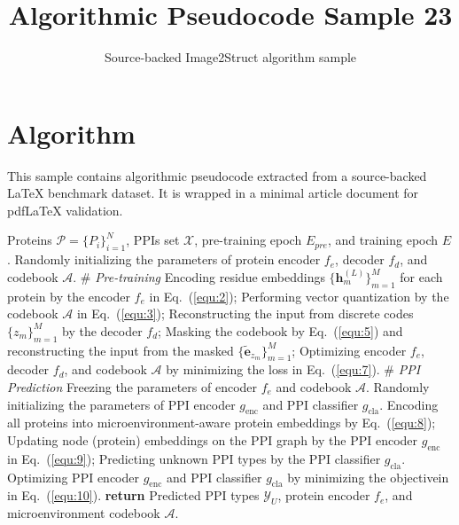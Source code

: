 \documentclass[11pt]{article}
\title{Algorithmic Pseudocode Sample 23}
\author{Source-backed Image2Struct algorithm sample}
\date{}
\begin{document}
\maketitle
\section{Algorithm}
This sample contains algorithmic pseudocode extracted from a source-backed LaTeX benchmark dataset. It is wrapped in a minimal article document for pdfLaTeX validation.

\begin{algorithm}[htbp]
\caption{Source-backed algorithmic procedure}
\begin{algorithmic}[1]
\Require Proteins $\mathcal{P}=\{P_i\}_{i=1}^N$, PPIs set $\mathcal{X}$, pre-training epoch $E_{pre}$, and training epoch $E$.
\State Randomly initializing the parameters of protein encoder $f_e$, decoder $f_d$, and codebook $\mathcal{A}$.
\State \# \textit{Pre-training}
\State Encoding residue embeddings $\{\mathbf{h}^{(L)}_m\}_{m=1}^M$ for each protein by the encoder $f_e$ in Eq.~(\ref{equ:2});
\State Performing vector quantization by the codebook $\mathcal{A}$ in Eq.~(\ref{equ:3});
\State Reconstructing the input from discrete codes $\{z_m\}_{m=1}^M$ by the decoder $f_d$;
\State Masking the codebook by Eq.~(\ref{equ:5}) and reconstructing the input from the masked $\{\widetilde{\mathbf{e}}_{z_m}\}_{m=1}^M$;
\State Optimizing encoder $f_e$, decoder $f_d$, and codebook $\mathcal{A}$ by minimizing the loss in Eq.~(\ref{equ:7}).
\EndFor
\State \# \textit{PPI Prediction}
\State Freezing the parameters of encoder $f_e$ and codebook $\mathcal{A}$.
\State Randomly initializing the parameters of PPI encoder $g_{\text{enc}}$ and PPI classifier $g_{\text{cla}}$.
\State Encoding all proteins into microenvironment-aware protein embeddings by Eq.~(\ref{equ:8});
\State Updating node (protein) embeddings on the PPI graph by the PPI encoder $g_{\text{enc}}$ in Eq.~(\ref{equ:9});
\State Predicting unknown PPI types by the PPI classifier $g_{\text{cla}}$.
\State Optimizing PPI encoder $g_{\text{enc}}$ and PPI classifier $g_{\text{cla}}$ by minimizing the objectivein in Eq.~(\ref{equ:10}).
\EndFor
\State \textbf{return} Predicted PPI types $\mathcal{Y}_U$, protein encoder $f_e$, and microenvironment codebook $\mathcal{A}$.
\end{algorithmic}
\end{algorithm}
\end{document}
